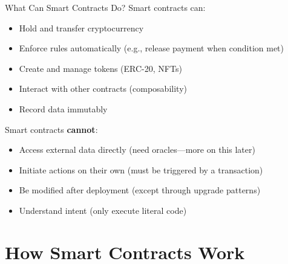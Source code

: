\documentclass[10pt]{beamer}
\newcommand{\good}[1]{\textcolor{AccentGreen}{#1}}
\newcommand{\bad}[1]{\textcolor{AccentOrange}{#1}}
\begin{document}
\begin{frame}{What Can Smart Contracts Do?}
  Smart contracts can:
  
  \vspace{0.5em}
  \begin{itemize}
    \item \good{Hold and transfer cryptocurrency}
    \item \good{Enforce rules automatically} (e.g., release payment when condition met)
    \item \good{Create and manage tokens} (ERC-20, NFTs)
    \item \good{Interact with other contracts} (composability)
    \item \good{Record data immutably}
  \end{itemize}
  
  \vspace{1em}
  Smart contracts \textbf{cannot}:
  
  \vspace{0.5em}
  \begin{itemize}
    \item \bad{Access external data directly} (need oracles---more on this later)
    \item \bad{Initiate actions on their own} (must be triggered by a transaction)
    \item \bad{Be modified after deployment} (except through upgrade patterns)
    \item \bad{Understand intent} (only execute literal code)
  \end{itemize}
\end{frame}

\section{How Smart Contracts Work}
\end{document}
